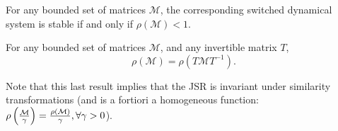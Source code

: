 \begin{property}
For any bounded set of matrices $\mathcal{M}$, the corresponding switched dynamical system is stable if and only if $\rho(\mathcal{M})<1$.
\end{property}

\begin{property}\label{rem:scaling}
For any bounded set of matrices $\mathcal{M}$, and any invertible matrix $T$, 
$$\rho(\mathcal{M})=\rho(T \mathcal{M} T^{-1}).$$
\end{property}

Note that this last result implies that the JSR is invariant under similarity transformations (and is a fortiori a homogeneous function: $\rho\left(\frac{\mathcal{M}}{\gamma}\right)=\frac{\rho(\mathcal{M})}{\gamma}, \forall \gamma > 0$).
